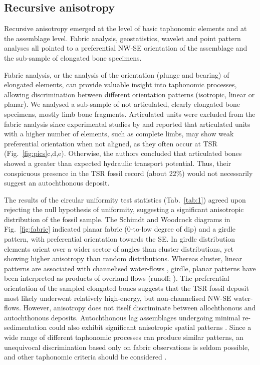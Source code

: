 \documentclass[review,times,authoryear]{elsarticle} %
\begin{document}
\subsection{Recursive anisotropy}

Recursive anisotropy emerged at the level of basic taphonomic elements and at the assemblage level. Fabric analysis, geostatistics, wavelet and point pattern analyses all pointed to a preferential NW-SE orientation of the assemblage and the sub-sample of elongated bone specimens.

Fabric analysis, or the analysis of the orientation (plunge and bearing) of elongated elements, can provide valuable insight into taphonomic processes, allowing discrimination between different orientation patterns (isotropic, linear or planar). We analysed a sub-sample of not articulated, clearly elongated bone specimens, mostly limb bone fragments. Articulated units were excluded from the fabric analysis since experimental studies by \cite{Coard1995} and \cite{Coard1999} reported that articulated units with a higher number of elements, such as complete limbs, may show weak preferential orientation when not aligned, as they often occur at TSR (Fig.~\ref{fig:pics}c,d,e). Otherwise, the authors concluded that articulated bones showed a greater than expected hydraulic transport potential. Thus, their conspicuous presence in the TSR fossil record (about 22\%) would not necessarily suggest an autochthonous deposit.

The results of the circular uniformity test statistics (Tab.~\ref{tab:1}) agreed upon rejecting the null hypothesis of uniformity, suggesting a significant anisotropic distribution of the fossil sample. The Schimdt and Woodcock diagrams in Fig.~\ref{fig:fabric} indicated planar fabric (0-to-low degree of dip) and a girdle pattern, with preferential orientation towards the SE. In girdle distribution elements orient over a wider sector of angles than cluster distributions, yet showing higher anisotropy than random distributions. Whereas cluster, linear patterns are associated with channelised water-flows \citep{Petraglia1994}, girdle, planar patterns have been interpreted as products of overland flows (runoff; \citealp{Organista2017}). The preferential orientation of the sampled elongated bones suggests that the TSR fossil deposit most likely underwent relatively high-energy, but non-channelised NW-SE water-flows. However, anisotropy does not itself discriminate between allochthonous and autochthonous deposits. Autochthonous lag assemblages undergoing minimal re-sedimentation could also exhibit significant anisotropic spatial patterns \citep{Dominguez-Rodrigo2012,Dominguez-Rodrigo2014a,Dominguez-Rodrigo2014b,Dominguez-Rodrigo2017}. Since a wide range of different taphonomic processes can produce similar patterns, an unequivocal discrimination based only on fabric observations is seldom possible, and other taphonomic criteria should be considered \citep{Lenoble2004}.
\end{document}
